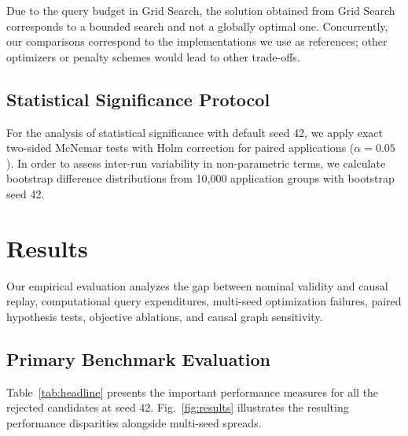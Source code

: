 \documentclass[nolineno]{paper/ieee-access/ieeeaccess}%
\begin{document}
Due to the query budget in Grid Search, the solution obtained from Grid Search corresponds to a bounded search and not a globally optimal one. Concurrently, our comparisons correspond to the implementations we use as references; other optimizers or penalty schemes would lead to other trade-offs.

\subsection{Statistical Significance Protocol}
For the analysis of statistical significance with default seed 42, we apply exact two-sided McNemar tests with Holm correction for paired applications ($\alpha=0.05$). In order to assess inter-run variability in non-parametric terms, we calculate bootstrap difference distributions from 10,000 application groups with bootstrap seed 42.

\section{Results}
\label{sec:results}
Our empirical evaluation analyzes the gap between nominal validity and causal replay, computational query expenditures, multi-seed optimization failures, paired hypothesis tests, objective ablations, and causal graph sensitivity.

\subsection{Primary Benchmark Evaluation}
\begin{table}[t]
\caption{Empirical evaluation of algorithmic recourse methods at search seed 42. Rates represent percentages of all queried individuals: recommendation validity ($V$), causal replay validity ($R$), actionability ($A$), state fidelity ($F$), and joint usability ($U = R \land A$). Action cost ($C$) is the mean scaled effort of the cheapest usable plan per successful applicant. Query count indicates mean black-box model evaluations per applicant.}
\label{tab:headline}
\centering\small

\end{table}

Table~\ref{tab:headline} presents the important performance measures for all the \TotalApplicants{} rejected candidates at seed 42. Fig.~\ref{fig:results} illustrates the resulting performance disparities alongside multi-seed spreads.
\end{document}
